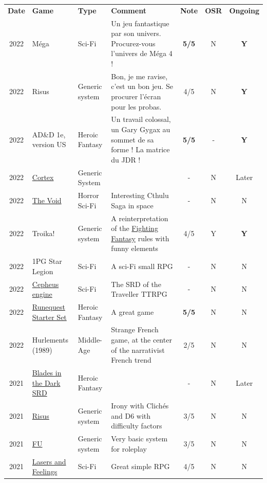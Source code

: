 \documentclass[a4paper, 11pt, twoside]{article}
\begin{document}
\begin{longtable}{cp{2cm}p{1.5cm}p{7cm}ccc}
\textbf{Date} & \textbf{Game} & \textbf{Type} & \textbf{Comment} & \textbf{Note} & \textbf{OSR} & \textbf{Ongoing}\\
2022 & Méga & Sci-Fi & Un jeu fantastique par son univers. Procurez-vous l'univers de Méga 4 ! & \textbf{5/5} & N & \textbf{Y}\\
2022 & Risus & Generic system & Bon, je me ravise, c'est un bon jeu. Se procurer l'écran pour les probas. & 4/5 & N & \textbf{Y}\\
2022 & AD\&D 1e, version US & Heroic Fantasy & Un travail colossal, un Gary Gygax au sommet de sa forme ! La matrice du JDR ! & \textbf{5/5} & - & \textbf{Y}\\
2022 & \href{https://www.cortexrpg.com/compendium/explore-the-rules/}{Cortex} & Generic System &  & - & N & Later\\
2022 & \href{https://www.drivethrurpg.com/product/117563}{The Void} & Horror Sci-Fi & Interesting Cthulu Saga in space & - & N & N\\
2022 & Troika! & Generic system & A reinterpretation of the \href{https://github.com/orey/jdr/tree/master/FightingFantasys-fr}{Fighting Fantasy} rules with funny elements & 4/5 & Y & \textbf{Y}\\
2022 & 1PG Star Legion & Sci-Fi & A sci-Fi small RPG & - & N & N\\
2022 & \href{https://www.drivethrurpg.com/product/186894/Cepheus-Engine-System-Reference-Document}{Cepheus engine} & Sci-Fi & The SRD of the Traveller TTRPG & - & N & N\\
2022 & \href{https://www.chaosium.com/runequest-starter-set/}{Runequest Starter Set} & Heroic Fantasy & A great game & \textbf{5/5} & N & N\\
2022 & Hurlements (1989) & Middle-Age & Strange French game, at the center of the narrativist French trend & 2/5 & N & N\\
2021 & \href{https://github.com/orey/jdr/tree/master/BladesInTheDark-SRD}{Blades in the Dark SRD} & Heroic Fantasy &  & - & N & Later\\
2021 & \href{https://github.com/orey/jdr/tree/master/Risus-fr}{Risus} & Generic system & Irony with Clichés and D6 with difficulty factors & 3/5 & N & N\\
2021 & \href{https://www.drivethrurpg.com/product/89534/FU-The-Freeform-Universal-RPG-Classic-rules}{FU} & Generic system & Very basic system for roleplay & 3/5 & N & N\\
2021 & \href{http://www.onesevendesign.com/laserfeelings/}{Lasers and Feelings} & Sci-Fi & Great simple RPG & 4/5 & N & N\\

\end{longtable}
\end{document}
